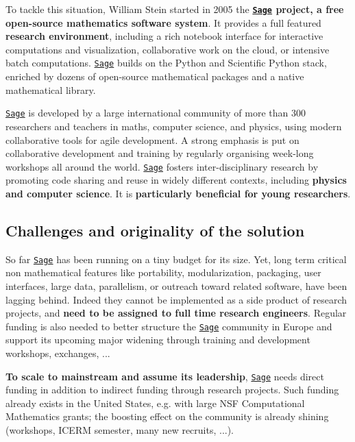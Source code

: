 \documentclass[a4,12pt]{amsart}
\newcommand{\sage}{\href{http://www.sagemath.org/}{\texttt{Sage}}\xspace}
\begin{document}
To tackle this situation, William Stein started in 2005 the
\textbf{\sage project, a free open-source mathematics software
  system}. It provides a full featured \textbf{research environment},
including a rich notebook interface for interactive computations and
visualization, collaborative work on the cloud, or intensive batch
computations. \sage builds on the Python and Scientific Python stack,
enriched by dozens of open-source mathematical packages and a native
mathematical library.

\sage is developed by a large international community of more than 300
researchers and teachers in maths, computer science, and physics,
using modern collaborative tools for agile development.  A strong
emphasis is put on collaborative development and training by regularly
organising week-long workshops all around the world. \sage fosters
inter-disciplinary research by promoting code sharing and reuse in
widely different contexts, including \textbf{physics and computer
  science}. It is \textbf{particularly beneficial for young
  researchers}.


\subsection{Challenges and originality of the solution}

So far \sage has been running on a tiny budget for its size. Yet, long
term critical non mathematical features like portability,
modularization, packaging, user interfaces, large data, parallelism,
or outreach toward related software, have been lagging behind. Indeed
they cannot be implemented as a side product of research projects, and
\textbf{need to be assigned to full time research engineers}. Regular
funding is also needed to better structure the \sage community in
Europe and support its upcoming major widening through training and
development workshops, exchanges, ...
%
%

\textbf{To scale to mainstream and assume its leadership}, \sage needs
direct funding in addition to indirect funding through research
projects. Such funding already exists in the United States, e.g. with
large %
NSF Computational Mathematics grants; the boosting effect on the
community is already shining (workshops, ICERM semester, many new
recruits, ...).
\end{document}
